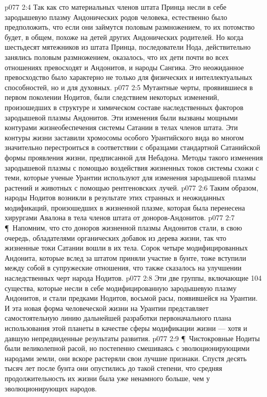 \vs p077 2:4 Так как сто материальных членов штата Принца несли в себе зародышевую плазму Андонических родов человека, естественно было предположить, что если они займутся половым размножением, то их потомство будет, в общем, похоже на детей других Андонических родителей. Но когда шестьдесят мятежников из штата Принца, последователи Нода, действительно занялись половым размножением, оказалось, что их дети почти во всех отношениях превосходят и Андонитов, и народы Сангика. Это неожиданное превосходство было характерно не только для физических и интеллектуальных способностей, но и для духовных.
\vs p077 2:5 Мутантные черты, проявившиеся в первом поколении Нодитов, были следствием некоторых изменений, произошедших в структуре и химическом составе наследственных факторов зародышевой плазмы Андонитов. Эти изменения были вызваны мощными контурами жизнеобеспечения системы Сатании в телах членов штата. Эти контуры жизни заставили хромосомы особого Урантийского вида во многом значительно перестроиться в соответствии с образцами стандартной Сатанийской формы проявления жизни, предписанной для Небадона. Методы такого изменения зародышевой плазмы с помощью воздействия жизненных токов системы схожи с теми, которые ученые Урантии используют для изменения зародышевой плазмы растений и животных с помощью рентгеновских лучей.
\vs p077 2:6 Таким образом, народы Нодитов возникли в результате этих странных и неожиданных модификаций, произошедших в жизненной плазме, которая была перенесена хирургами Авалона в тела членов штата от доноров\hyp{}Андонитов.
\vs p077 2:7 \P\ Напомним, что сто доноров жизненной плазмы Андонитов стали, в свою очередь, обладателями органических добавок из дерева жизни, так что жизненные токи Сатании вошли в их тела. Сорок четыре модифицированных Андонита, которые вслед за штатом приняли участие в бунте, тоже вступили между собой в супружеские отношения, что также сказалось на улучшении наследственных черт народа Нодитов.
\vs p077 2:8 Эти две группы, включающие 104 существа, которые несли в себе модифицированную зародышевую плазму Андонитов, и стали предками Нодитов, восьмой расы, появившейся на Урантии. И эта новая форма человеческой жизни на Урантии представляет самостоятельную линию дальнейшей разработки первоначального плана использования этой планеты в качестве сферы модификации жизни --- хотя и давшую непредвиденные результаты развития.
\vs p077 2:9 \P\ Чистокровные Нодиты были великолепной расой, но постепенно смешиваясь с эволюционирующими народами земли, они вскоре растеряли свои лучшие признаки. Спустя десять тысяч лет после бунта они опустились до такой степени, что средняя продолжительность их жизни была уже ненамного больше, чем у эволюционирующих народов.
